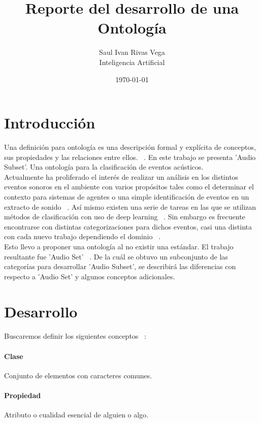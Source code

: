 \documentclass[12pt]{article}
\title{Reporte del desarrollo de una Ontología}
\author{
	Saul Ivan Rivas Vega \\
	Inteligencia Artificial\\ 
}
\date{\today}
\begin{document}
	\maketitle
	
	\section{Introducción}
	Una definición para ontología es una descripción formal y explícita de conceptos, sus propiedades y las relaciones entre ellos. ~\cite{ontology_101}. En este trabajo se presenta 'Audio Subset'. Una ontología para la clasificación de eventos acústicos.\\
	Actualmente ha proliferado el interés de realizar un análisis en los distintos eventos sonoros en el ambiente con varios propósitos tales como el determinar el contexto para sistemas de agentes o una simple identificación de eventos en un extracto de sonido ~\cite{noauthor_computational_2017}. Así mismo existen una serie de tareas en las que se utilizan métodos de clasificación con uso de deep learning ~\cite{purwins_deep_2019}. Sin embargo es frecuente encontrarse con distintas categorizaciones para dichos eventos, casi una distinta con cada nuevo trabajo dependiendo el dominio ~\cite{eck_finding_2002, turpault_semi-supervised_2019, benetos_detection_2016}.\\
	Esto llevo a proponer una ontología al no existir una estándar. El trabajo resultante fue 'Audio Set' ~\cite{gemmeke_audio_2017}.
	De la cuál se obtuvo un subconjunto de las categorías para desarrollar 'Audio Subset', se describirá las diferencias con respecto a 'Audio Set' y algunos conceptos adicionales.
	\pagebreak
	\section{Desarrollo}
	\paragraph{}
	Buscaremos definir los siguientes conceptos
	~\cite{rae_2014}:
	\paragraph{Clase} Conjunto de elementos con caracteres comunes. 
	\paragraph{Propiedad} Atributo o cualidad esencial de alguien o algo.
\end{document}
